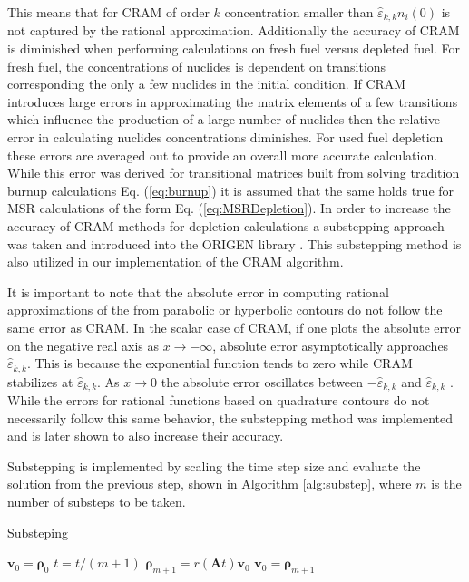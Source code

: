 \noindent This means that for CRAM of order $k$ concentration smaller than $\hat{\varepsilon}_{k,k}n_{i}(0)$ is not captured by the rational approximation. Additionally the accuracy of CRAM is diminished when performing calculations on fresh fuel versus depleted fuel. For fresh fuel, the concentrations of nuclides is dependent on transitions corresponding the only a few nuclides in the initial condition. If CRAM introduces large errors in approximating the matrix elements of a few transitions which influence the production of a large number of nuclides then the relative error in calculating nuclides concentrations diminishes. For used fuel depletion these errors are averaged out to provide an overall more accurate calculation. While this error was derived for transitional matrices built from solving tradition burnup calculations Eq. (\ref{eq:burnup}) it is assumed that the same holds true for MSR calculations of the form Eq. (\ref{eq:MSRDepletion}). In order to increase the accuracy of CRAM methods for depletion calculations a substepping approach was taken and introduced into the ORIGEN library \cite{isotalo2016}. This substepping method is also utilized in our implementation of the CRAM algorithm. 

It is important to note that the absolute error in computing rational approximations of the from parabolic or hyperbolic contours do not follow the same error as CRAM. In the scalar case of CRAM, if one plots the absolute error on the negative real axis as $x \rightarrow -\infty$, absolute error asymptotically approaches $\hat{\varepsilon}_{k,k}$. This is because the exponential function tends to zero while CRAM stabilizes at $\hat{\varepsilon}_{k,k}$. As $x \rightarrow 0$ the absolute error oscillates between $-\hat{\varepsilon}_{k,k}$ and $\hat{\varepsilon}_{k,k}$ \cite{pusaAccruacy2013}. While the errors for rational functions based on quadrature contours do not necessarily follow this same behavior, the substepping method was implemented and is later shown to also increase their accuracy. 

Substepping is implemented by scaling the time step size and evaluate the solution from the previous step, shown in Algorithm \ref{alg:substep}, where $m$ is the number of substeps to be taken. 

\begin{algorithm}
	\caption{Substeping} 
	\begin{algorithmic}[1]
	    \State $\boldsymbol{v}_{0} = \boldsymbol{\rho}_{0}$
	    \State $t = t/(m+1)$
            \State $\boldsymbol{\rho}_{m+1} = r(\boldsymbol{A}t)\boldsymbol{v}_{0}$
            \State $\boldsymbol{v}_{0} = \boldsymbol{\rho}_{m+1}$
		\EndFor
	\end{algorithmic} 
	\label{alg:substep}
\end{algorithm}



